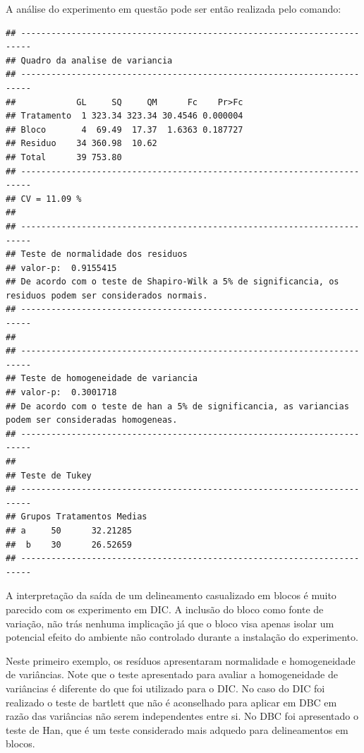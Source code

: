 \documentclass[
]{article}
\newenvironment{Shaded}{\begin{snugshade}}{\end{snugshade}}
\newcommand{\DataTypeTok}[1]{\textcolor[rgb]{0.13,0.29,0.53}{#1}}
\newcommand{\KeywordTok}[1]{\textcolor[rgb]{0.13,0.29,0.53}{\textbf{#1}}}
\newcommand{\NormalTok}[1]{#1}
\newcommand{\OperatorTok}[1]{\textcolor[rgb]{0.81,0.36,0.00}{\textbf{#1}}}
\newcommand{\StringTok}[1]{\textcolor[rgb]{0.31,0.60,0.02}{#1}}
\begin{document}
A análise do experimento em questão pode ser então realizada pelo comando:

\begin{Shaded}
\end{Shaded}

\begin{verbatim}
## ------------------------------------------------------------------------
## Quadro da analise de variancia
## ------------------------------------------------------------------------
##            GL     SQ     QM      Fc    Pr>Fc
## Tratamento  1 323.34 323.34 30.4546 0.000004
## Bloco       4  69.49  17.37  1.6363 0.187727
## Residuo    34 360.98  10.62                 
## Total      39 753.80                        
## ------------------------------------------------------------------------
## CV = 11.09 %
## 
## ------------------------------------------------------------------------
## Teste de normalidade dos residuos 
## valor-p:  0.9155415 
## De acordo com o teste de Shapiro-Wilk a 5% de significancia, os residuos podem ser considerados normais.
## ------------------------------------------------------------------------
## 
## ------------------------------------------------------------------------
## Teste de homogeneidade de variancia 
## valor-p:  0.3001718 
## De acordo com o teste de han a 5% de significancia, as variancias podem ser consideradas homogeneas.
## ------------------------------------------------------------------------
## 
## Teste de Tukey
## ------------------------------------------------------------------------
## Grupos Tratamentos Medias
## a     50      32.21285 
##  b    30      26.52659 
## ------------------------------------------------------------------------
\end{verbatim}

A interpretação da saída de um delineamento casualizado em blocos é muito parecido com os experimento em DIC. A inclusão do bloco como fonte de variação, não trás nenhuma implicação já que o bloco visa apenas isolar um potencial efeito do ambiente não controlado durante a instalação do experimento.

Neste primeiro exemplo, os resíduos apresentaram normalidade e homogeneidade de variâncias. Note que o teste apresentado para avaliar a homogeneidade de variâncias é diferente do que foi utilizado para o DIC. No caso do DIC foi realizado o teste de bartlett que não é aconselhado para aplicar em DBC em razão das variâncias não serem independentes entre si. No DBC foi apresentado o teste de Han, que é um teste considerado mais adquedo para delineamentos em blocos.
\end{document}
